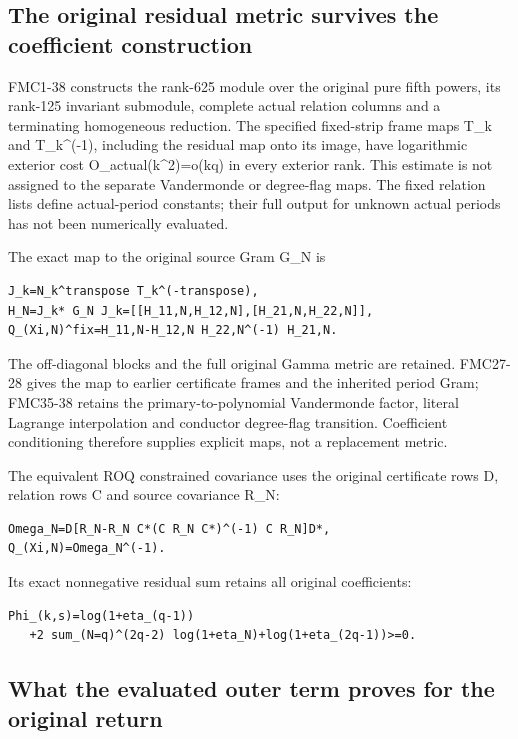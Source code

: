 \documentclass[
]{article}
\begin{document}
\subsection{The original residual metric survives the coefficient
construction}\label{the-original-residual-metric-survives-the-coefficient-construction}

FMC1-38 constructs the rank-625 module over the original pure fifth
powers, its rank-125 invariant submodule, complete actual relation
columns and a terminating homogeneous reduction. The specified
fixed-strip frame maps T\_k and T\_k\^{}(-1), including the residual map
onto its image, have logarithmic exterior cost O\_actual(k\^{}2)=o(kq)
in every exterior rank. This estimate is not assigned to the separate
Vandermonde or degree-flag maps. The fixed relation lists define
actual-period constants; their full output for unknown actual periods
has not been numerically evaluated.

The exact map to the original source Gram G\_N is

\begin{verbatim}
J_k=N_k^transpose T_k^(-transpose),
H_N=J_k* G_N J_k=[[H_11,N,H_12,N],[H_21,N,H_22,N]],
Q_(Xi,N)^fix=H_11,N-H_12,N H_22,N^(-1) H_21,N.
\end{verbatim}

The off-diagonal blocks and the full original Gamma metric are retained.
FMC27-28 gives the map to earlier certificate frames and the inherited
period Gram; FMC35-38 retains the primary-to-polynomial Vandermonde
factor, literal Lagrange interpolation and conductor degree-flag
transition. Coefficient conditioning therefore supplies explicit maps,
not a replacement metric.

The equivalent ROQ constrained covariance uses the original certificate
rows D, relation rows C and source covariance R\_N:

\begin{verbatim}
Omega_N=D[R_N-R_N C*(C R_N C*)^(-1) C R_N]D*,
Q_(Xi,N)=Omega_N^(-1).
\end{verbatim}

Its exact nonnegative residual sum retains all original coefficients:

\begin{verbatim}
Phi_(k,s)=log(1+eta_(q-1))
   +2 sum_(N=q)^(2q-2) log(1+eta_N)+log(1+eta_(2q-1))>=0.
\end{verbatim}

\subsection{What the evaluated outer term proves for the original
return}\label{what-the-evaluated-outer-term-proves-for-the-original-return}
\end{document}
